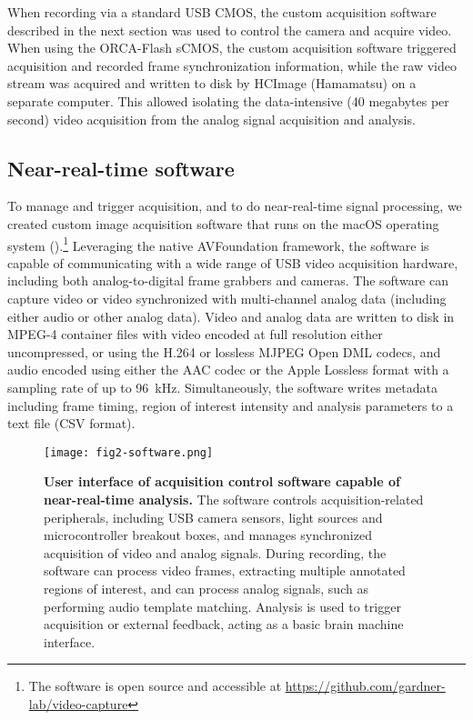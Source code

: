 When recording via a standard USB CMOS, the custom 
acquisition software described in the next section 
was used to control the camera and acquire video. 
When using the ORCA-Flash sCMOS, the custom 
acquisition software triggered acquisition and 
recorded frame synchronization information, while 
the raw video stream was acquired and written to 
disk by HCImage (Hamamatsu) on a separate computer. 
This allowed isolating the data-intensive (40 
megabytes per second) video acquisition from the 
analog signal acquisition and analysis.

\subsection{Near-real-time software}

To manage and trigger acquisition, and to do near-real-time signal
processing, we created custom image acquisition software that runs
on the macOS operating system ().\footnote{The 
software is open source and accessible at 
\url{https://github.com/gardner-lab/video-capture}}
Leveraging the native AVFoundation framework, the software is 
capable of communicating with a wide range of USB video 
acquisition hardware, including both analog-to-digital frame 
grabbers and cameras. The software can capture video or video 
synchronized with multi-channel analog data (including 
either audio or other analog data). Video and analog data are 
written to disk in MPEG-4 container files with video encoded at 
full resolution either uncompressed, or using the H.264 or lossless 
MJPEG Open DML codecs, and audio encoded using either the AAC codec 
or the Apple Lossless format with a sampling rate of up to 
96~\si{\kilo\hertz}. Simultaneously, the software writes metadata 
including frame timing, region of interest intensity and analysis  
parameters to a text file (CSV format).

\begin{figure}
\texttt{[image: fig2-software.png]}
\caption[Software for capture and near-real-time analysis]{\textbf{User interface of acquisition
control software capable of near-real-time analysis.} The software 
controls acquisition-related peripherals, including USB camera sensors,
light sources and microcontroller breakout boxes, and manages 
synchronized acquisition of video and analog signals. During 
recording, the software can process video frames, extracting 
multiple annotated regions of interest, and can process analog 
signals, such as performing audio template matching. Analysis 
is used to trigger acquisition or external feedback, acting as 
a basic brain machine interface.}
\label{fig:software}
\end{figure}


